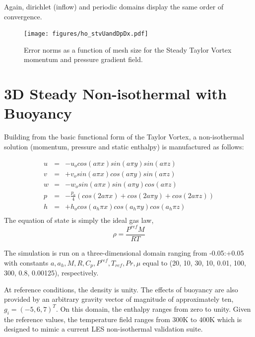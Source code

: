 Again, dirichlet (inflow) and periodic domains display the same order of convergence.

\begin{figure}
\centerline{\texttt{[image: figures/ho\_stvUandDpDx.pdf]}}
\caption{Error norms as a function of mesh size for the Steady Taylor Vortex 
momentum and pressure gradient field.}
\label{fig:hoSTVMMS}
\end{figure}

\section{3D Steady Non-isothermal with Buoyancy}

Building from the basic functional form of the Taylor Vortex,
a non-isothermal solution (momentum, pressure and static enthalpy)
is manufactured as follows:

\begin{eqnarray}
  u &=& -u_o cos(a \pi x) sin(a \pi y ) sin(a \pi z) \nonumber \\
  v &=& +v_o sin(a \pi x) cos(a \pi y ) sin(a \pi z) \nonumber \\
  w &=& -w_o sin(a \pi x) sin(a \pi y ) cos(a \pi z) \nonumber \\
  p &=& -\frac{p_o}{4}( cos(2 a \pi x) + cos(2 a \pi y ) + cos(2 a \pi z) )  \nonumber \\
  h &=& +h_o cos(a_h \pi x) cos(a_h \pi y ) cos(a_h \pi z)  \nonumber \\
\label{3dNonIso}
\end{eqnarray}
%
The equation of state is simply the ideal gas law, 
\begin{equation}
  \rho = \frac{P^{ref} M}{R T}
\label{idealGasEOS}
\end{equation}

The simulation is run on a three-dimensional domain ranging from -0.05:+0.05 with
constants $a, a_h, M, R, C_p, P^{ref}, T_{ref}, Pr, \mu$ equal to 
(20, 10, 30, 10, 0.01, 100, 300, 0.8, 0.00125), respectively.

At reference conditions, the density is unity. The effects of buoyancy are also provided 
by an arbitrary gravity vector of magnitude of approximately ten, $g_i = (-5, 6, 7)^T$. On this domain, 
the enthalpy ranges from zero to unity. Given the reference values, the temperature 
field ranges from 300K to 400K which is designed to mimic a current LES non-isothermal 
validation suite.


